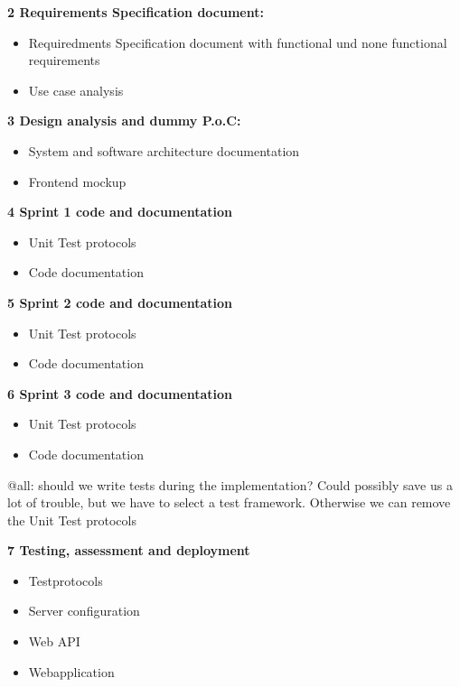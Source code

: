 \documentclass[notitlepage]{article}
\begin{document}
\begin{flushleft}
\textbf{2 Requirements Specification document:}
\\
\begin{itemize}
	\item Requiredments Specification document with functional und none functional requirements
	\item Use case analysis
\end{itemize}

\textbf{3 Design analysis and dummy P.o.C:}
\\
\begin{itemize}
	\item System and software architecture documentation
	\item Frontend mockup
\end{itemize}

\textbf{4 Sprint 1 code and documentation }
\\
\begin{itemize}
	\item Unit Test protocols
	\item Code documentation
\end{itemize}

\textbf{5  Sprint 2 code and documentation }
\\
\begin{itemize}
	\item Unit Test protocols
	\item Code documentation
\end{itemize}

\textbf{6 Sprint 3 code and documentation }
\\
\begin{itemize}
	\item Unit Test protocols
	\item Code documentation
\end{itemize}

{\color{red} @all: should we write tests during the implementation? Could possibly save us a lot of trouble, but we have to select a test framework.
Otherwise we can remove the Unit Test protocols}

\textbf{7 Testing, assessment and deployment}
\\
\begin{itemize}
	\item Testprotocols
	\item Server configuration
	\item Web API 
	\item Webapplication
\end{itemize}


\end{flushleft}
\end{document}
